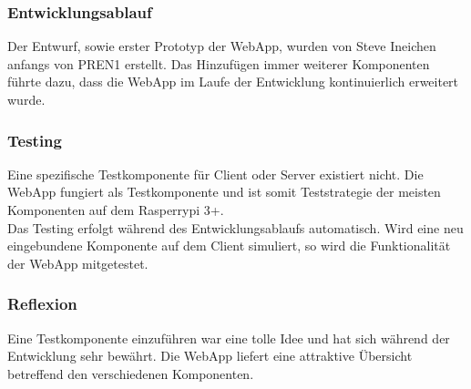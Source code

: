 \documentclass[../../main.tex]{subfiles}
\begin{document}
\pagebreak

\subsubsection{Entwicklungsablauf}
Der Entwurf, sowie erster Prototyp der WebApp, wurden von Steve Ineichen anfangs von PREN1 erstellt. Das Hinzufügen immer weiterer Komponenten führte dazu, dass die WebApp im Laufe der Entwicklung kontinuierlich erweitert wurde.

\subsubsection{Testing}
Eine spezifische Testkomponente für Client oder Server existiert nicht. Die WebApp fungiert als Testkomponente und ist somit Teststrategie der meisten Komponenten auf dem Rasperrypi 3+.
\\
Das Testing erfolgt während des Entwicklungsablaufs automatisch. Wird eine neu eingebundene Komponente auf dem Client simuliert, so wird die Funktionalität der WebApp mitgetestet.

\subsubsection{Reflexion}
Eine Testkomponente einzuführen war eine tolle Idee und hat sich während der Entwicklung sehr bewährt. Die WebApp liefert eine attraktive Übersicht betreffend den verschiedenen Komponenten.
\end{document}
